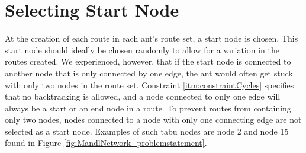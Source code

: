\section{Selecting Start Node}

At the creation of each route in each ant's route set, a start node is chosen. This start node should ideally be chosen randomly to allow for a variation in the routes created. We experienced, however, that if the start node is connected to another node that is only connected by one edge, the ant would often get stuck with only two nodes in the route set. Constraint \vref{itm:constraintCycles} specifies that no backtracking is allowed, and a node connected to only one edge will always be a start or an end node in a route. To prevent routes from containing only two nodes, nodes connected to a node with only one connecting edge are not selected as a start node. Examples of such tabu nodes are node 2 and node 15 found in Figure \vref{fig:MandlNetwork_problemstatement}. 